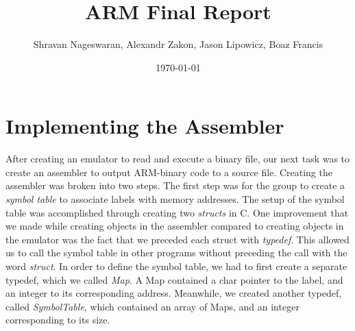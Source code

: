 \documentclass[11pt]{article}
\begin{document}
\title{\textbf{ARM Final Report}}
\author{Shravan Nageswaran, Alexandr Zakon, Jason Lipowicz, Boaz Francis}
\date{\today}

\maketitle

\vspace{0.2in}

\section{Implementing the Assembler}

After creating an emulator to read and execute a binary file, our next task was to create an assembler to output ARM-binary code to a source file. Creating the assembler was broken into two steps. The first step was for the group to create a \emph{symbol table} to associate labels with memory addresses. The setup of the symbol table was accomplished through creating two \emph{structs} in C. One improvement that we made while creating objects in the assembler compared to creating objects in the emulator was the fact that we preceded each struct with \emph{typedef}. This allowed us to call the symbol table in other programs without preceding the call with the word \emph{struct}. In order to define the symbol table, we had to first create a separate typedef, which we called \emph{Map}. A Map contained a char pointer to the label, and an integer to its corresponding address. Meanwhile, we created another typedef, called \emph{SymbolTable}, which contained an array of Maps, and an integer corresponding to its size.
\end{document}
